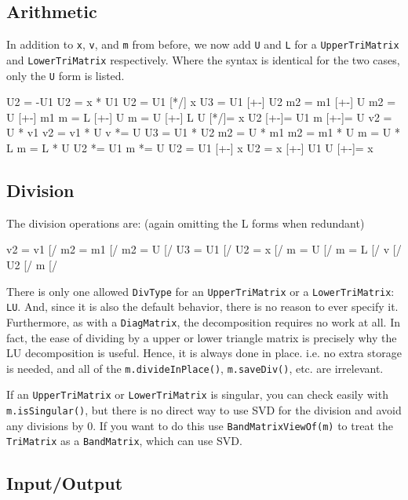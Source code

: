 \documentclass[twoside,letterpaper,11pt]{article}
\renewcommand{\tt}[1]{{\lstinline {#1}}}
\begin{document}
\subsection{Arithmetic}
\label{TriMatrix_Arithmetic}

In addition to \tt{x}, \tt{v}, and \tt{m} from before, 
we now add \tt{U} and \tt{L} for a \tt{UpperTriMatrix}
and \tt{LowerTriMatrix} respectively.  Where the syntax is identical
for the two cases, only the \tt{U} form is listed.

\begin{tmvcode}
U2 = -U1
U2 = x * U1
U2 = U1 [*/] x
U3 = U1 [+-] U2
m2 = m1 [+-] U
m2 = U [+-] m1
m = L [+-] U
m = U [+-] L
U [*/]= x
U2 [+-]= U1
m [+-]= U
v2 = U * v1
v2 = v1 * U
v *= U
U3 = U1 * U2
m2 = U * m1
m2 = m1 * U
m = U * L
m = L * U
U2 *= U1
m *= U
U2 = U1 [+-] x
U2 = x [+-] U1
U [+-]= x
\end{tmvcode}

\subsection{Division}
\label{TriMatrix_Division}

The division operations are: (again omitting the L forms when redundant)
\begin{tmvcode}
v2 = v1 [/%
m2 = m1 [/%
m2 = U [/%
U3 = U1 [/%
U2 = x [/%
m = U [/%
m = L [/%
v [/%
U2 [/%
m [/%
\end{tmvcode}

There is only one allowed \tt{DivType} for an \tt{UpperTriMatrix} or a 
\tt{LowerTriMatrix}: \tt{LU}.
And, since it is also the default behavior,
there is no reason to ever specify it.
Furthermore, as with a \tt{DiagMatrix},
the decomposition requires no work at all.  In fact, the ease of dividing by a 
upper or lower triangle matrix is precisely why the LU decomposition is useful.
Hence, it is always done in place.  i.e. no extra storage is needed, and all of
the \tt{m.divideInPlace()}, \tt{m.saveDiv()}, etc. are irrelevant.

If an \tt{UpperTriMatrix} or \tt{LowerTriMatrix} is singular, 
you can check easily with \tt{m.isSingular()},
but there is no direct way to use SVD for the division and avoid any
divisions by 0.  If you want to do this use \tt{BandMatrixViewOf(m)} to 
treat the \tt{TriMatrix} as a \tt{BandMatrix}, which can use SVD.

\subsection{Input/Output}
\label{TriMatrix_IO}
\end{document}
